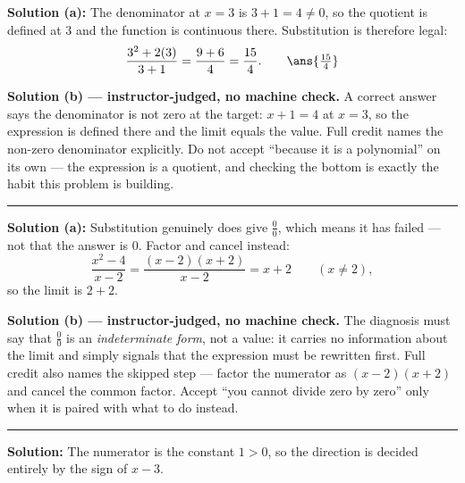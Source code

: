 \documentclass[12pt]{article}
\begin{document}



\textbf{Solution (a):} The denominator at $x = 3$ is $3 + 1 = 4 \neq 0$, so the
quotient is defined at $3$ and the function is continuous there. Substitution is
therefore legal:
\[
  \frac{3^2 + 2(3)}{3 + 1} = \frac{9 + 6}{4} = \frac{15}{4}. \qquad \ans{\tfrac{15}{4}}
\]

\textbf{Solution (b) --- instructor-judged, no machine check.} A correct answer
says the denominator is not zero at the target: $x + 1 = 4$ at $x = 3$, so the
expression is defined there and the limit equals the value. Full credit names
the non-zero denominator explicitly. Do not accept ``because it is a
polynomial'' on its own --- the expression is a quotient, and checking the bottom
is exactly the habit this problem is building.

\vspace{0.2cm}\noindent\rule{\linewidth}{0.2pt}\vspace{0.2cm}


\textbf{Solution (a):} Substitution genuinely does give $\frac{0}{0}$, which
means it has failed --- not that the answer is $0$. Factor and cancel instead:
\[
  \frac{x^2-4}{x-2} = \frac{(x-2)(x+2)}{x-2} = x + 2 \qquad (x \neq 2),
\]
so the limit is $2 + 2$. 

\textbf{Solution (b) --- instructor-judged, no machine check.} The diagnosis
must say that $\frac{0}{0}$ is an \emph{indeterminate form}, not a value: it
carries no information about the limit and simply signals that the expression
must be rewritten first. Full credit also names the skipped step --- factor the
numerator as $(x-2)(x+2)$ and cancel the common factor. Accept ``you cannot
divide zero by zero'' only when it is paired with what to do instead.

\vspace{0.2cm}\noindent\rule{\linewidth}{0.2pt}\vspace{0.2cm}


\textbf{Solution:} The numerator is the constant $1 > 0$, so the direction is
decided entirely by the sign of $x - 3$.
\end{document}
